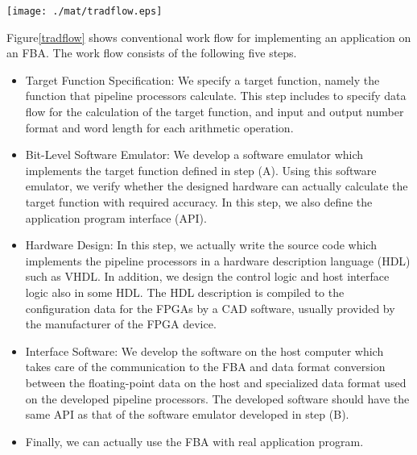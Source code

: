 \documentclass{llncs}
\begin{document}
\begin{figure*}[htb]
\begin{center}
\texttt{[image: ./mat/tradflow.eps]}
\caption{Conventional work flow for implementing an application on a FBA system.}
\label{tradflow}
\end{center}
\end{figure*}

Figure\ref{tradflow} shows conventional work flow for implementing an application on an FBA.
The work flow consists of the following five steps.

\begin{itemize}
\setlength{\itemsep}{6pt}

\item[(A)] Target Function Specification:
We specify a target function, namely the function that pipeline
processors calculate. This step includes to specify 
data flow for the calculation of the target function, 
and input and output number format and word length for each arithmetic operation. 

\item[(B)] Bit-Level Software Emulator:
We develop a software emulator which implements the target function
defined in step (A). Using this software emulator, we verify
whether the designed hardware can actually calculate the target
function with required accuracy. In this step, we also define the
application program interface (API). 

\item[(C)]  Hardware Design:
In this step, we actually write the source code which implements the
pipeline processors in a hardware description language (HDL) such as VHDL.
In addition, we design the control logic and host interface logic also
in some HDL. The HDL description is compiled to the configuration data
for the FPGAs by a CAD software, usually provided by the
manufacturer of the FPGA device.

\item[(D)] Interface Software:
We develop the software on the host computer which takes care of the
communication to the FBA and data format conversion between the
floating-point data on the host and specialized data format used on
the developed pipeline processors. The developed software should have
the same API as that of the software emulator developed in step (B).

\item[(E)] Finally, we can actually use the FBA with
real application program.
\end{itemize}
\end{document}
